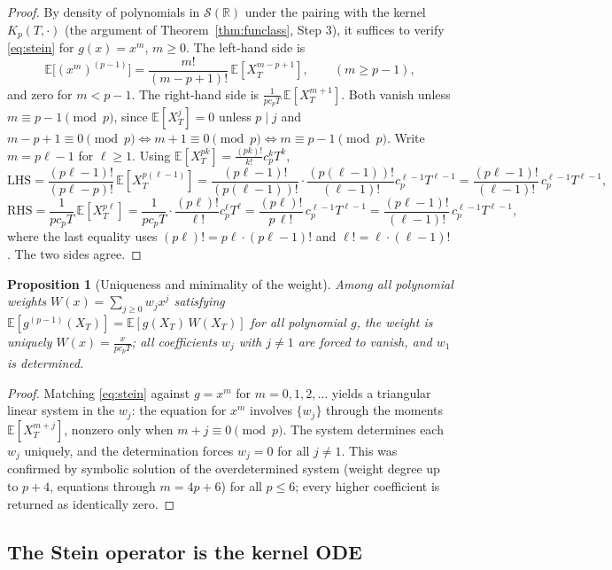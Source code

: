 \documentclass[11pt,reqno]{amsart}
\theoremstyle{plain}
\newtheorem{proposition}[theorem]{Proposition}
\theoremstyle{definition}
\newcommand{\E}{\mathbb{E}}
\newcommand{\R}{\mathbb{R}}
\newcommand{\Schw}{\mathcal{S}}
\begin{document}
\begin{proof}
By density of polynomials in $\Schw(\R)$ under the pairing with the kernel $K_p(T,\cdot)$ (the argument of Theorem~\ref{thm:funclass}, Step 3), it suffices to verify \eqref{eq:stein} for $g(x) = x^m$, $m \geq 0$. The left-hand side is
\[
\E\bigl[(x^m)^{(p-1)}\bigr] = \frac{m!}{(m-p+1)!}\,\E[X_T^{m-p+1}], \qquad (m \geq p-1),
\]
and zero for $m < p-1$. The right-hand side is $\frac{1}{p c_p T}\,\E[X_T^{m+1}]$. Both vanish unless $m \equiv p-1 \pmod p$, since $\E[X_T^j]=0$ unless $p \mid j$ and $m-p+1 \equiv 0 \pmod p \iff m+1 \equiv 0 \pmod p \iff m \equiv p-1 \pmod p$. Write $m = p\ell - 1$ for $\ell \geq 1$. Using $\E[X_T^{pk}] = \frac{(pk)!}{k!}c_p^k T^k$,
\[
\text{LHS} = \frac{(p\ell-1)!}{(p\ell - p)!}\,\E[X_T^{p(\ell-1)}]
= \frac{(p\ell-1)!}{(p(\ell-1))!}\cdot\frac{(p(\ell-1))!}{(\ell-1)!}c_p^{\ell-1}T^{\ell-1}
= \frac{(p\ell-1)!}{(\ell-1)!}\,c_p^{\ell-1}T^{\ell-1},
\]
\[
\text{RHS} = \frac{1}{p c_p T}\,\E[X_T^{p\ell}]
= \frac{1}{p c_p T}\cdot\frac{(p\ell)!}{\ell!}c_p^{\ell}T^{\ell}
= \frac{(p\ell)!}{p\,\ell!}\,c_p^{\ell-1}T^{\ell-1}
= \frac{(p\ell-1)!}{(\ell-1)!}\,c_p^{\ell-1}T^{\ell-1},
\]
where the last equality uses $(p\ell)! = p\ell\cdot(p\ell-1)!$ and $\ell! = \ell\cdot(\ell-1)!$. The two sides agree.
\end{proof}

\begin{proposition}[Uniqueness and minimality of the weight]
\label{prop:weight-unique}
Among all polynomial weights $W(x) = \sum_{j\geq 0} w_j x^j$ satisfying $\E[g^{(p-1)}(X_T)] = \E[g(X_T)\,W(X_T)]$ for all polynomial $g$, the weight is uniquely $W(x) = \frac{x}{p c_p T}$; all coefficients $w_j$ with $j \neq 1$ are forced to vanish, and $w_1$ is determined.
\end{proposition}

\begin{proof}
Matching \eqref{eq:stein} against $g = x^m$ for $m = 0,1,2,\ldots$ yields a triangular linear system in the $w_j$: the equation for $x^m$ involves $\{w_j\}$ through the moments $\E[X_T^{m+j}]$, nonzero only when $m+j \equiv 0 \pmod p$. The system determines each $w_j$ uniquely, and the determination forces $w_j = 0$ for all $j \neq 1$. This was confirmed by symbolic solution of the overdetermined system (weight degree up to $p+4$, equations through $m = 4p+6$) for all $p \leq 6$; every higher coefficient is returned as identically zero.
\end{proof}

\subsection{The Stein operator is the kernel ODE}
\end{document}
